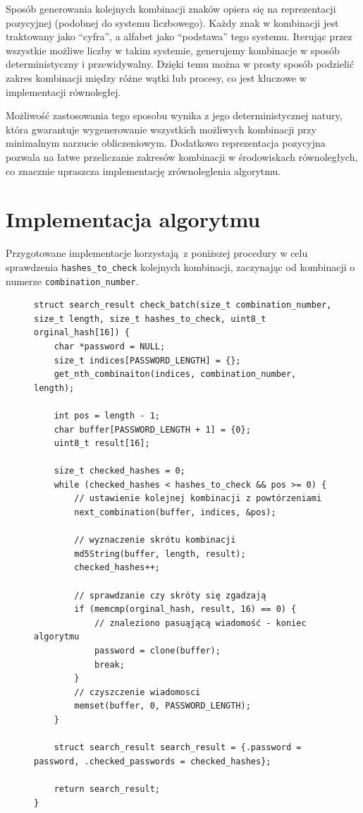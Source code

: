\documentclass[a4paper,12pt]{article}
\begin{document}
Sposób generowania kolejnych kombinacji znaków opiera się na reprezentacji pozycyjnej (podobnej do systemu liczbowego). Każdy znak w kombinacji jest traktowany jako ``cyfra'', a alfabet jako ``podstawa'' tego systemu. Iterując przez wszystkie możliwe liczby w takim systemie, generujemy kombinacje w sposób deterministyczny i przewidywalny. Dzięki temu można w prosty sposób podzielić zakres kombinacji między różne wątki lub procesy, co jest kluczowe w implementacji równoległej.

Możliwość zastosowania tego sposobu wynika z jego deterministycznej natury, która gwarantuje wygenerowanie wszystkich możliwych kombinacji przy minimalnym narzucie obliczeniowym. Dodatkowo reprezentacja pozycyjna pozwala na łatwe przeliczanie zakresów kombinacji w środowiskach równoległych, co znacznie upraszcza implementację zrównoleglenia algorytmu.

\section{Implementacja algorytmu}

Przygotowane implementacje korzystają z poniższej procedury w celu sprawdzenia \lstinline{hashes_to_check} kolejnych kombinacji, zaczynając od kombinacji o numerze \lstinline{combination_number}.

\begin{figure}[H]
	\begin{lstlisting}[caption={Sprawdzanie partii wiadomości.}]
struct search_result check_batch(size_t combination_number, size_t length, size_t hashes_to_check, uint8_t orginal_hash[16]) {
    char *password = NULL;
    size_t indices[PASSWORD_LENGTH] = {};
    get_nth_combinaiton(indices, combination_number, length);

    int pos = length - 1;
    char buffer[PASSWORD_LENGTH + 1] = {0};
    uint8_t result[16];

    size_t checked_hashes = 0;
    while (checked_hashes < hashes_to_check && pos >= 0) {
        // ustawienie kolejnej kombinacji z powtórzeniami
        next_combination(buffer, indices, &pos);

        // wyznaczenie skrótu kombinacji
        md5String(buffer, length, result);
        checked_hashes++;

        // sprawdzanie czy skróty się zgadzają
        if (memcmp(orginal_hash, result, 16) == 0) {
            // znaleziono pasuąjącą wiadomość - koniec algorytmu
            password = clone(buffer);
            break;
        }
        // czyszczenie wiadomosci
        memset(buffer, 0, PASSWORD_LENGTH);
    }

    struct search_result search_result = {.password = password, .checked_passwords = checked_hashes};

    return search_result;
}
\end{lstlisting}
\end{figure}
\end{document}
